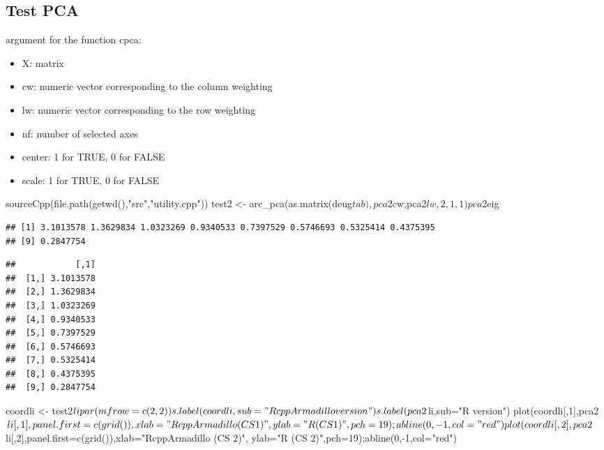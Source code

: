 \documentclass[
  10pt,
]{article}
\newenvironment{Shaded}{\begin{snugshade}}{\end{snugshade}}
\newcommand{\NormalTok}[1]{#1}
\providecommand{\tightlist}{%
  \setlength{\itemsep}{0pt}\setlength{\parskip}{0pt}}
\begin{document}
\hypertarget{test-pca}{%
\subsection{Test PCA}\label{test-pca}}

argument for the function cpca:

\begin{itemize}
\tightlist
\item
  X: matrix
\item
  cw: numeric vector corresponding to the column weighting
\item
  lw: numeric vector corresponding to the row weighting
\item
  nf: number of selected axes
\item
  center: 1 for TRUE, 0 for FALSE
\item
  scale: 1 for TRUE, 0 for FALSE
\end{itemize}

\begin{Shaded}
\begin{Highlighting}[]
\NormalTok{sourceCpp(file.path(getwd(),"src","utility.cpp"))}
\NormalTok{test2 \textless{}{-} arc\_pca(as.matrix(deug$tab),pca2$cw,pca2$lw,2,1,1)}
\NormalTok{pca2$eig}
\end{Highlighting}
\end{Shaded}

\begin{verbatim}
## [1] 3.1013578 1.3629834 1.0323269 0.9340533 0.7397529 0.5746693 0.5325414 0.4375395
## [9] 0.2847754
\end{verbatim}

\begin{Shaded}
\end{Shaded}

\begin{verbatim}
##            [,1]
##  [1,] 3.1013578
##  [2,] 1.3629834
##  [3,] 1.0323269
##  [4,] 0.9340533
##  [5,] 0.7397529
##  [6,] 0.5746693
##  [7,] 0.5325414
##  [8,] 0.4375395
##  [9,] 0.2847754
\end{verbatim}

\begin{Shaded}
\begin{Highlighting}[]
\NormalTok{coordli \textless{}{-} test2$li}
\NormalTok{par(mfrow=c(2,2))}
\NormalTok{s.label(coordli,sub="RcppArmadillo version")}
\NormalTok{s.label(pca2$li,sub="R version")}
\NormalTok{plot(coordli[,1],pca2$li[,1],panel.first=c(grid()),xlab="RcppArmadillo (CS 1)",}
\NormalTok{     ylab="R (CS 1)",pch=19);abline(0,{-}1,col="red")}
\NormalTok{plot(coordli[,2],pca2$li[,2],panel.first=c(grid()),xlab="RcppArmadillo (CS 2)",}
\NormalTok{     ylab="R (CS 2)",pch=19);abline(0,{-}1,col="red")}
\end{Highlighting}
\end{Shaded}
\end{document}
